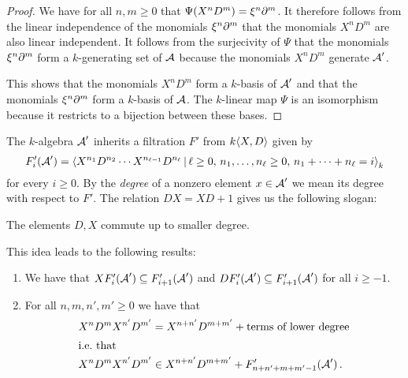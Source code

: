 \begin{proof}
  We have for all $n, m \geq 0$ that $\Psi(X^n D^m) = \xi^n \partial^m$.
  It therefore follows from the linear independence of the monomials $\xi^n \partial^m$ that the monomials $X^n D^m$ are also linear independent.
  It follows from the surjecivity of $\Psi$ that the monomials $\xi^n \partial^m$ form a $k$-generating set of $\operatorname{\mathcal{A}}$ because the monomials $X^n D^m$ generate $\operatorname{\mathcal{A}}'$.
  
  This shows that the monomials $X^n D^m$ form a $k$-basis of $\operatorname{\mathcal{A}}'$ and that the monomials $\xi^n \partial^m$ form a $k$-basis of $\operatorname{\mathcal{A}}$.
  The $k$-linear map $\Psi$ is an isomorphism because it restricts to a bijection between these bases.
\end{proof}


\begin{fluff}
  The $k$-algebra $\operatorname{\mathcal{A}}'$ inherits a filtration $F'$ from $k\langle X,D \rangle$ given by
  \begin{equation}
    \label{equation: filtration of Weyl via quotient}
      F'_i(\weyl')
    = \gen{
        X^{n_1} D^{n_2} \dotsm X^{n_{\ell-1}} D^{n_\ell}
      \suchthat
        \ell \geq 0, \,
        n_1, \dotsc, n_\ell \geq 0, \,
        n_1 + \dotsb + n_\ell = i
      }_k
  \end{equation}
  for every $i \geq 0$.
  By the \emph{degree} of a nonzero element $x \in \operatorname{\mathcal{A}}'$ we mean its degree with respect to $F'$.
  The relation $D X = X D + 1$ gives us the following slogan:
  \begin{center}
    The elements $D, X$ commute up to smaller degree.
  \end{center}
  This idea leads to the following results:
\end{fluff}


\begin{lemma}
  \label{lemma: two monomonial commute up to smaller degree}
  \leavevmode
  \begin{enumerate}
    \item
      We have that $X F'_i(\operatorname{\mathcal{A}}') \subseteq F'_{i+1}(\operatorname{\mathcal{A}}')$ and $D F'_i(\operatorname{\mathcal{A}}') \subseteq F'_{i+1}(\operatorname{\mathcal{A}}')$ for all $i \geq -1$.
    \item
      For all $n, m, n', m' \geq 0$ we have that
      \begin{align*}
              X^n D^m X^{n'} D^{m'}
        &=    X^{n+n'} D^{m+m'} + \text{terms of lower degree}  \\
    \shortintertext{i.e.\ that}
              X^n D^m X^{n'} D^{m'}
        &\in  X^{n+n'} D^{m+m'} + F'_{n+n'+m+m'-1}(\operatorname{\mathcal{A}}') \,.
      \end{align*}
  \end{enumerate}
\end{lemma}


